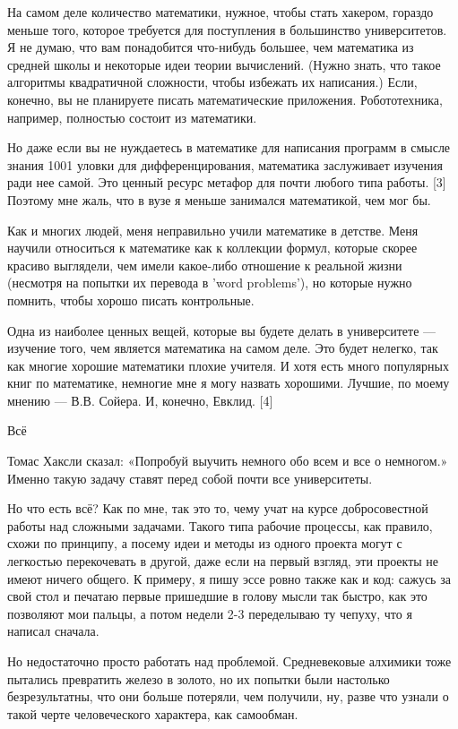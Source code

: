 \documentclass[ebook,12pt,oneside,openany]{memoir}
\begin{document}
На самом деле количество математики, нужное, чтобы стать хакером,
гораздо меньше того, которое требуется для поступления в большинство
университетов. Я не думаю, что вам понадобится что-нибудь большее, чем
математика из средней школы и некоторые идеи теории вычислений. (Нужно
знать, что такое алгоритмы квадратичной сложности, чтобы избежать их
написания.) Если, конечно, вы не планируете писать математические
приложения. Робототехника, например, полностью состоит из математики.

Но даже если вы не нуждаетесь в математике для написания программ в
смысле знания 1001 уловки для дифференцирования, математика
заслуживает изучения ради нее самой. Это ценный ресурс метафор для
почти любого типа работы. [3] Поэтому мне жаль, что в вузе я меньше
занимался математикой, чем мог бы.

Как и многих людей, меня неправильно учили математике в детстве. Меня
научили относиться к математике как к коллекции формул, которые скорее
красиво выглядели, чем имели какое-либо отношение к реальной жизни
(несмотря на попытки их перевода в 'word problems'), но которые нужно
помнить, чтобы хорошо писать контрольные.

Одна из наиболее ценных вещей, которые вы будете делать в университете
— изучение того, чем является математика на самом деле. Это будет
нелегко, так как многие хорошие математики плохие учителя. И хотя есть
много популярных книг по математике, немногие мне я могу назвать
хорошими. Лучшие, по моему мнению — В.В. Сойера. И, конечно, Евклид.
[4]

Всё

Томас Хаксли сказал: «Попробуй выучить немного обо всем и все о
немногом.» Именно такую задачу ставят перед собой почти все
университеты.

Но что есть всё? Как по мне, так это то, чему учат на курсе
добросовестной работы над сложными задачами. Такого типа рабочие
процессы, как правило, схожи по принципу, а посему идеи и методы из
одного проекта могут с легкостью перекочевать в другой, даже если на
первый взгляд, эти проекты не имеют ничего общего. К примеру, я пишу
эссе ровно также как и код: сажусь за свой стол и печатаю первые
пришедшие в голову мысли так быстро, как это позволяют мои пальцы, а
потом недели 2-3 переделываю ту чепуху, что я написал сначала.

Но недостаточно просто работать над проблемой. Средневековые алхимики
тоже пытались превратить железо в золото, но их попытки были настолько
безрезультатны, что они больше потеряли, чем получили, ну, разве что
узнали о такой черте человеческого характера, как самообман.
\end{document}
